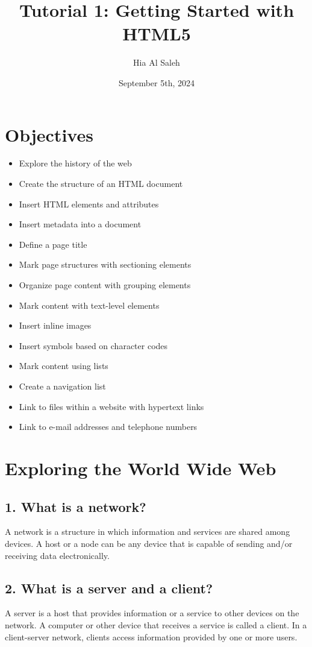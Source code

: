 \documentclass{article}
\title{Tutorial 1: Getting Started with HTML5}
\author{Hia Al Saleh}
\date{September 5th, 2024}
\begin{document}
\maketitle
\tableofcontents
\newpage 

\section{Objectives}
\begin{itemize}
    \item Explore the history of the web
    \item Create the structure of an HTML document
    \item Insert HTML elements and attributes
    \item Insert metadata into a document
    \item Define a page title
    \item Mark page structures with sectioning elements
    \item Organize page content with grouping elements
    \item Mark content with text-level elements
    \item Insert inline images
    \item Insert symbols based on character codes
    \item Mark content using lists
    \item Create a navigation list
    \item Link to files within a website with hypertext links
    \item Link to e-mail addresses and telephone numbers
\end{itemize}

\section{Exploring the World Wide Web}
\subsection*{1. What is a network?}
A network is a structure in which information and services are shared among devices. A host or a node can be any device that is capable of sending and/or receiving data electronically.

\subsection*{2. What is a server and a client?}
A server is a host that provides information or a service to other devices on the network. A computer or other device that receives a service is called a client. In a client-server network, clients access information provided by one or more users.
\end{document}
